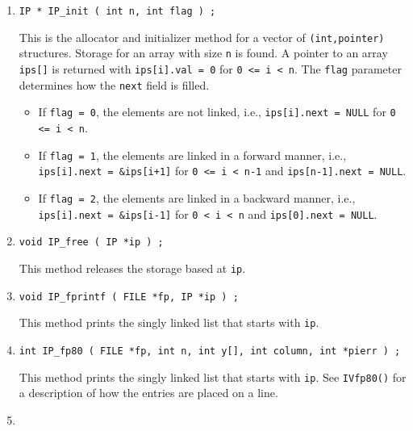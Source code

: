 \begin{enumerate}
\item
\begin{verbatim}
IP * IP_init ( int n, int flag ) ;
\end{verbatim}
This is the allocator and initializer method for a vector of 
{\tt (int,pointer)} structures.
Storage for an array with size {\tt n} is found.
A pointer to an array {\tt ips[]} is returned
with {\tt ips[i].val = 0} for {\tt 0 <= i < n}.
The {\tt flag} parameter determines how the {\tt next} field
is filled.
\begin{itemize}
\item
If {\tt flag = 0}, the elements are not linked,
i.e., {\tt ips[i].next = NULL} 
for {\tt 0 <= i < n}.
\item
If {\tt flag = 1}, the elements are linked in a forward manner,
i.e., {\tt ips[i].next = \&ips[i+1]} 
for {\tt 0 <= i < n-1} and {\tt ips[n-1].next = NULL}.
\item
If {\tt flag = 2}, the elements are linked in a backward manner,
i.e., {\tt ips[i].next = \&ips[i-1]} 
for {\tt 0 < i < n} and {\tt ips[0].next = NULL}.
\end{itemize}
\item
\begin{verbatim}
void IP_free ( IP *ip ) ;
\end{verbatim}
This method releases the storage based at {\tt *ip}.
\item
\begin{verbatim}
void IP_fprintf ( FILE *fp, IP *ip ) ;
\end{verbatim}
This method prints the singly linked list that starts with {\tt ip}.
\item
\begin{verbatim}
int IP_fp80 ( FILE *fp, int n, int y[], int column, int *pierr ) ;
\end{verbatim}
This method prints the singly linked list that starts with {\tt ip}.
See {\tt IVfp80()} for a description of how the entries are placed
on a line.
\item

\end{enumerate}
